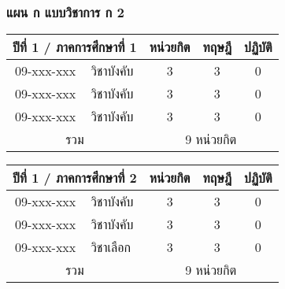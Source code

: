 \newpage
\subsubsection*{แผน ก แบบวิชาการ ก 2}

\renewcommand{\arraystretch}{1.4}
\begin{tabular}{|cp{}|ccc|}
\hline
\multicolumn{2}{|c|}{ปีที่ 1 / ภาคการศึกษาที่ 1} & \multicolumn{1}{c|}{หน่วยกิต} & \multicolumn{1}{c|}{ทฤษฎี} & \multicolumn{1}{c|}{ปฏิบัติ}  \\ \hline
\multicolumn{1}{|c|}{09-xxx-xxx}  & วิชาบังคับ  & \multicolumn{1}{c|}{3}        & \multicolumn{1}{c|}{3}     & \multicolumn{1}{c|}{0}                   \\ \hline
\multicolumn{1}{|c|}{09-xxx-xxx}  & วิชาบังคับ  & \multicolumn{1}{c|}{3}        & \multicolumn{1}{c|}{3}     & \multicolumn{1}{c|}{0}                    \\ \hline
\multicolumn{1}{|c|}{09-xxx-xxx}  & วิชาบังคับ  & \multicolumn{1}{c|}{3}        & \multicolumn{1}{c|}{3}     & \multicolumn{1}{c|}{0}                   \\ \hline
\multicolumn{2}{|c|}{รวม}                        & \multicolumn{3}{c|}{9 หน่วยกิต}                                                                            \\ \hline
\end{tabular}

\vspace{5ex}\par\noindent
\renewcommand{\arraystretch}{1.4}
\begin{tabular}{|cp{}|ccc|}
\hline
\multicolumn{2}{|c|}{ปีที่ 1 / ภาคการศึกษาที่ 2} & \multicolumn{1}{c|}{หน่วยกิต} & \multicolumn{1}{c|}{ทฤษฎี} & \multicolumn{1}{c|}{ปฏิบัติ}  \\ \hline
\multicolumn{1}{|c|}{09-xxx-xxx}  & วิชาบังคับ  & \multicolumn{1}{c|}{3}        & \multicolumn{1}{c|}{3}     & \multicolumn{1}{c|}{0}                    \\ \hline
\multicolumn{1}{|c|}{09-xxx-xxx}  & วิชาบังคับ  & \multicolumn{1}{c|}{3}        & \multicolumn{1}{c|}{3}     & \multicolumn{1}{c|}{0}                    \\ \hline
\multicolumn{1}{|c|}{09-xxx-xxx}  & วิชาเลือก  & \multicolumn{1}{c|}{3}        & \multicolumn{1}{c|}{3}     & \multicolumn{1}{c|}{0}                   \\ \hline
\multicolumn{2}{|c|}{รวม}                        & \multicolumn{3}{c|}{9 หน่วยกิต}                                                                            \\ \hline
\end{tabular}

